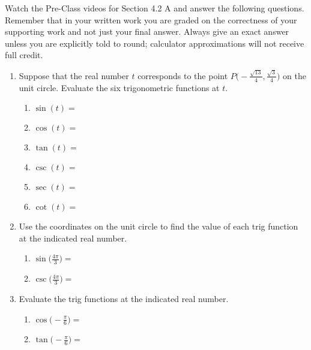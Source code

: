 


\noindent Watch the Pre-Class videos for Section 4.2 A and answer the following questions. Remember that in your written work you are graded on the correctness of your supporting work and not just your final answer. Always give an exact answer unless you are explicitly told to round; calculator approximations will not receive full credit. 


\begin{enumerate}
\item  Suppose that the real number $t$ corresponds to the point $\displaystyle P\Big(-\frac{\sqrt{13}}{4},\frac{\sqrt{3}}{4}\Big)$ on the unit circle.  Evaluate the six trigonometric functions at $t$.
\begin{enumerate}

\item $\sin(t)=$\vfill
\item $\cos(t)=$\vfill
\item $\tan(t)=$\vfill
\item $\csc(t)=$\vfill
\item $\sec(t)=$\vfill
\item $\cot(t)=$\vfill
\end{enumerate}




\newpage


\item Use the coordinates on the unit circle to find the value of each trig function at the indicated real number.
\begin{enumerate}
\item $\displaystyle \sin\Big(\frac{4\pi}{3}\Big)=$\vfill
\item $\displaystyle \csc\Big(\frac{4\pi}{3}\Big)=$\vfill
\end{enumerate}

\item  Evaluate the trig functions at the indicated real number.
\begin{enumerate}
\item $\displaystyle \cos\Big(-\frac{\pi}{6}\Big)=$\vfill
\item $\displaystyle \tan\Big(-\frac{\pi}{6}\Big)=$\vfill
\end{enumerate}




\end{enumerate}



